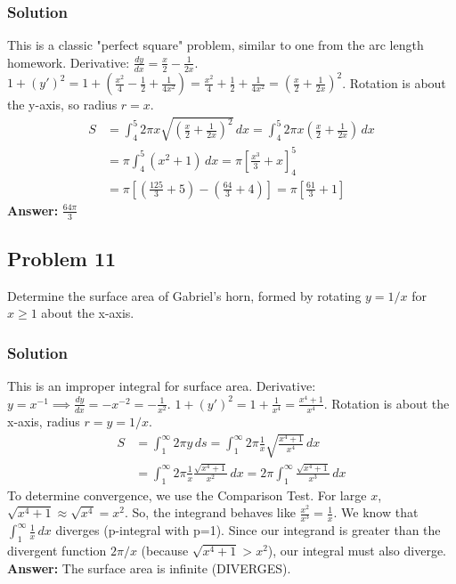 \documentclass{article}
\begin{document}
\subsubsection*{Solution}
This is a classic "perfect square" problem, similar to one from the arc length homework.
Derivative: $ \frac{dy}{dx} = \frac{x}{2} - \frac{1}{2x} $.
$1+(y')^2 = 1 + (\frac{x^2}{4} - \frac{1}{2} + \frac{1}{4x^2}) = \frac{x^2}{4} + \frac{1}{2} + \frac{1}{4x^2} = (\frac{x}{2} + \frac{1}{2x})^2 $.
Rotation is about the y-axis, so radius $r=x$.
\begin{align*}
    S &= \int_4^5 2\pi x \sqrt{(\frac{x}{2} + \frac{1}{2x})^2} \,dx = \int_4^5 2\pi x (\frac{x}{2} + \frac{1}{2x}) \,dx \\
    &= \pi \int_4^5 (x^2+1) \,dx = \pi [\frac{x^3}{3} + x]_4^5 \\
    &= \pi [(\frac{125}{3}+5) - (\frac{64}{3}+4)] = \pi[\frac{61}{3} + 1]
\end{align*}
\textbf{Answer:} $ \frac{64\pi}{3} $

\subsection{Problem 11}
Determine the surface area of Gabriel's horn, formed by rotating $y=1/x$ for $x \ge 1$ about the x-axis.
\subsubsection*{Solution}
This is an improper integral for surface area.
Derivative: $y=x^{-1} \implies \frac{dy}{dx} = -x^{-2} = -\frac{1}{x^2} $.
$1+(y')^2 = 1 + \frac{1}{x^4} = \frac{x^4+1}{x^4} $.
Rotation is about the x-axis, radius $r=y=1/x$.
\begin{align*}
    S &= \int_1^\infty 2\pi y \,ds = \int_1^\infty 2\pi \frac{1}{x} \sqrt{\frac{x^4+1}{x^4}} \,dx \\
    &= \int_1^\infty 2\pi \frac{1}{x} \frac{\sqrt{x^4+1}}{x^2} \,dx = 2\pi \int_1^\infty \frac{\sqrt{x^4+1}}{x^3} \,dx
\end{align*}
To determine convergence, we use the Comparison Test. For large $x$, $\sqrt{x^4+1} \approx \sqrt{x^4} = x^2$.
So, the integrand behaves like $ \frac{x^2}{x^3} = \frac{1}{x} $.
We know that $ \int_1^\infty \frac{1}{x} \,dx $ diverges (p-integral with p=1).
Since our integrand is greater than the divergent function $2\pi/x$ (because $\sqrt{x^4+1} > x^2$), our integral must also diverge.
\textbf{Answer:} The surface area is infinite (DIVERGES).
\end{document}
